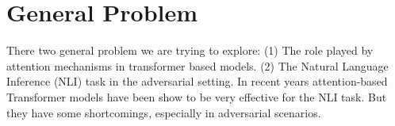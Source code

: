 \section{General Problem}
\label{sec:general problem}

There two general problem we are trying to explore:  (1) The role played by attention mechanisms in transformer based models. (2) The Natural Language Inference (NLI) task in the adversarial setting. In recent years attention-based Transformer models have been show to be very effective for the NLI task. But they have some shortcomings, especially in adversarial scenarios.